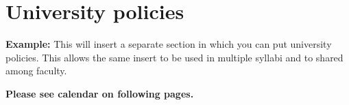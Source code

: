 \section*{University policies}
\skippers
\noindent\textbf{Example:} This will insert a separate section in which you can put university policies. This allows the same insert to be used in multiple syllabi and to shared among faculty.

\skippers
\skippers
\begin{center}
	\textbf{Please see calendar on following pages.}
\end{center}